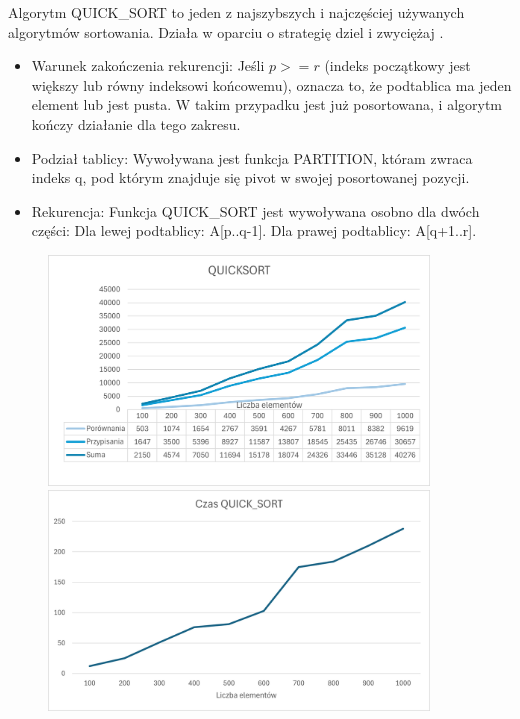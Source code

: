 \documentclass{article}
\begin{document}
	Algorytm QUICK\_SORT to jeden z najszybszych i najczęściej używanych algorytmów sortowania. Działa w oparciu o strategię dziel i zwyciężaj .
	\begin{itemize}
		\item Warunek zakończenia rekurencji:
		Jeśli $p >= r$ (indeks początkowy jest większy lub równy indeksowi końcowemu), oznacza to, że podtablica ma jeden element lub jest pusta. W takim przypadku jest już posortowana, i algorytm kończy działanie dla tego zakresu.
		
		\item Podział tablicy:
		Wywoływana jest funkcja PARTITION, któram zwraca indeks q, pod którym znajduje się pivot w swojej posortowanej pozycji.
		
		\item Rekurencja:
		Funkcja QUICK\_SORT jest wywoływana osobno dla dwóch części:
		Dla lewej podtablicy: A[p..q-1].
		Dla prawej podtablicy: A[q+1..r].
	\end{itemize}
	
	\begin{figure}[H]
		\centering
		\includegraphics[width=0.9\textwidth]{QS11.png}
		\includegraphics[width=0.9\textwidth]{QS12.png}
	\end{figure}
	
\end{document}
